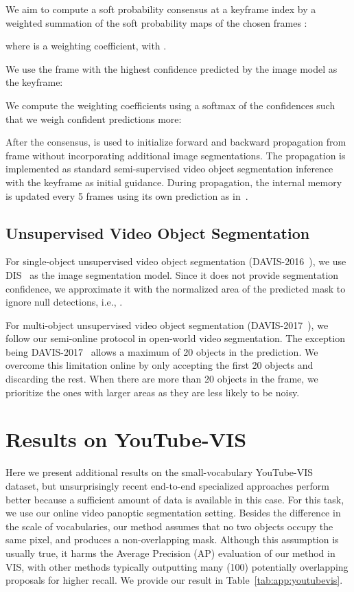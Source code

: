We aim to compute a soft probability consensus  at a keyframe index  by a weighted summation of the soft probability maps of the chosen frames :

where  is a weighting coefficient, with .

We use the frame with the highest confidence predicted by the image model as the keyframe:


We compute the weighting coefficients using a softmax of the confidences such that we weigh confident predictions more:


After the consensus,  is used to initialize forward and backward propagation from frame  without incorporating additional image segmentations.
The propagation is implemented as standard semi-supervised video object segmentation inference with the keyframe as initial guidance.
During propagation, the internal memory  is updated every 5 frames using its own prediction as in~\cite{cheng2022xmem}.

\subsection{Unsupervised Video Object Segmentation}
For single-object unsupervised video object segmentation (DAVIS-2016~\cite{perazzi2016benchmark}), we use DIS~\cite{qin2022highly} as the image segmentation model. 
Since it does not provide segmentation confidence, we approximate it with the normalized area of the predicted mask to ignore null detections, i.e., .

For multi-object unsupervised video object segmentation (DAVIS-2017~\cite{caelles2019}), we follow our semi-online protocol in open-world video segmentation. 
The exception being DAVIS-2017~\cite{caelles2019} allows a maximum of 20 objects in the prediction. 
We overcome this limitation online by only accepting the first 20 objects and discarding the rest. 
When there are more than 20 objects in the frame, we prioritize the ones with larger areas as they are less likely to be noisy.

\section{Results on YouTube-VIS}\label{sec:app:youtube-vis-results}
Here we present additional results on the small-vocabulary YouTube-VIS~\cite{yang2019video} dataset, but unsurprisingly recent end-to-end specialized approaches perform better because a sufficient amount of data is available in this case.
For this task, we use our online video panoptic segmentation setting.
Besides the difference in the scale of vocabularies, our method assumes that no two objects occupy the same pixel, and produces a non-overlapping mask. 
Although this assumption is usually true, it harms the Average Precision (AP) evaluation of our method in VIS, with other methods typically outputting many (100) potentially overlapping proposals for higher recall. We provide our result in Table~\ref{tab:app:youtubevis}.

